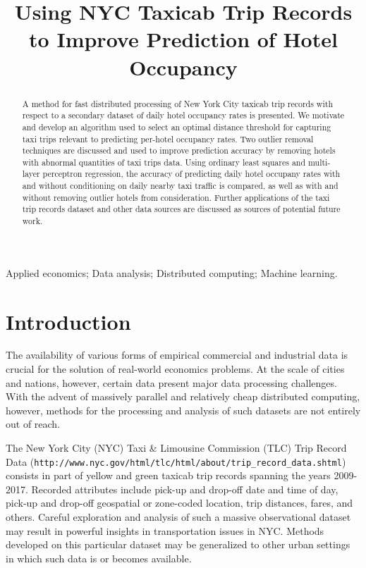 \documentclass[useAMS, referee, usenatbib]{biom}
\title{Using NYC Taxicab Trip Records to Improve Prediction of Hotel Occupancy}
\begin{document}
\label{firstpage}

\begin{abstract}
A method for fast distributed processing of New York City taxicab trip records with respect to a secondary dataset of daily hotel occupancy rates is presented. We motivate and develop an algorithm used to select an optimal distance threshold for capturing taxi trips relevant to predicting per-hotel occupancy rates. Two outlier removal techniques are discussed and used to improve prediction accuracy by removing hotels with abnormal quantities of taxi trips data. Using ordinary least squares and multi-layer perceptron regression, the accuracy of predicting daily hotel occupany rates with and without conditioning on daily nearby taxi traffic is compared, as well as with and without removing outlier hotels from consideration. Further applications of the taxi trip records dataset and other data sources are discussed as sources of potential future work.
\end{abstract}

\begin{keywords}
Applied economics; Data analysis; Distributed computing; Machine learning.
\end{keywords}

\maketitle

\section{Introduction}
\label{s:intro}

The availability of various forms of empirical commercial and industrial data is crucial for the solution of real-world economics problems. At the scale of cities and nations, however, certain data present major data processing challenges. With the advent of massively parallel and relatively cheap distributed computing, however, methods for the processing and analysis of such datasets are not entirely out of reach.

The New York City (NYC) Taxi \& Limousine Commission (TLC) Trip Record Data (\texttt{http://www.nyc.gov/html/tlc/html/about/trip\_record\_data.shtml}) consists in part of yellow and green taxicab trip records spanning the years 2009-2017. Recorded attributes include pick-up and drop-off date and time of day, pick-up and drop-off geospatial or zone-coded location, trip distances, fares, and others. Careful exploration and analysis of such a massive observational dataset may result in powerful insights in transportation issues in NYC. Methods developed on this particular dataset may be generalized to other urban settings in which such data is or becomes available.
\end{document}
